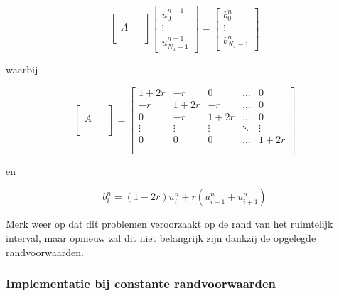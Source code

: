 \documentclass[a4paper,kulak]{kulakarticle} %
\begin{document}
\begin{equation}
	\begin{bmatrix}
		\qquad \\
		A \\
		\\ 
	\end{bmatrix}
	\begin{bmatrix}
		u_0^{n+1} \\
		\vdots \\
		u_{N_x - 1}^{n+1}
	\end{bmatrix}
	=
	\begin{bmatrix}
		b_0^n \\
		\vdots \\
		b_{N_x - 1}^n
	\end{bmatrix}
	\label{eq:impl_matrix}	
\end{equation}

waarbij

\begin{equation*}
	\begin{bmatrix}
		\qquad \\
		A \\
		\\ 
	\end{bmatrix}
	=
	\begin{bmatrix}
		1+2r	&	-r		&	0		&	\dots	&	0 		\\
		-r		&	1+2r	&	-r		&	\dots	&	0		\\
		0		&	-r		&	1+2r	&	\dots	&	0		\\
		\vdots	&	\vdots	&	\vdots	&	\ddots	&	\vdots	\\
		0		&	0		&	0		&	\dots	&	1+2r	\\
		\\ 
	\end{bmatrix}
\end{equation*}

en

\begin{equation*}
	b_i^n = (1-2r)u_i^n + r(u_{i-1}^n + u_{i+1}^n)
\end{equation*}

Merk weer op dat dit problemen veroorzaakt op de rand van het ruimtelijk interval, maar opnieuw zal dit niet belangrijk zijn dankzij de opgelegde randvoorwaarden. 

\subsubsection{Implementatie bij constante randvoorwaarden}
\end{document}
